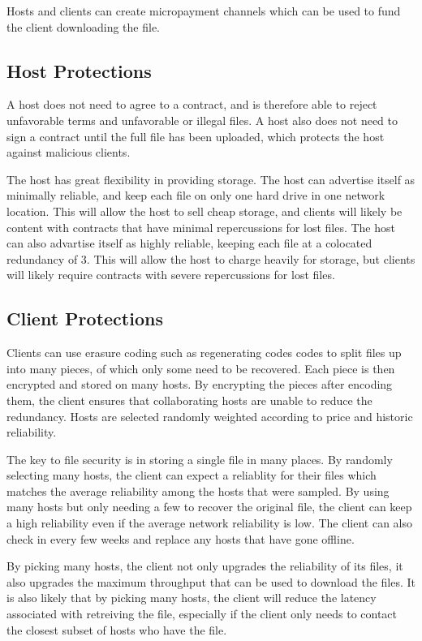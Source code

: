 \documentclass[twocolumn]{article}
\begin{document}
Hosts and clients can create micropayment channels \cite{mpc} which can be used to fund the client downloading the file.

\subsection{Host Protections}
A host does not need to agree to a contract, and is therefore able to reject unfavorable terms and unfavorable or illegal files.
A host also does not need to sign a contract until the full file has been uploaded, which protects the host against malicious clients.

The host has great flexibility in providing storage.
The host can advertise itself as minimally reliable, and keep each file on only one hard drive in one network location.
This will allow the host to sell cheap storage, and clients will likely be content with contracts that have minimal repercussions for lost files.
The host can also advartise itself as highly reliable, keeping each file at a colocated redundancy of 3.
This will allow the host to charge heavily for storage, but clients will likely require contracts with severe repercussions for lost files.

\subsection{Client Protections}
Clients can use erasure coding such as regenerating codes \cite{reg} codes to split files up into many pieces, of which only some need to be recovered.
Each piece is then encrypted and stored on many hosts.
By encrypting the pieces after encoding them, the client ensures that collaborating hosts are unable to reduce the redundancy.
Hosts are selected randomly weighted according to price and historic reliability.

The key to file security is in storing a single file in many places.
By randomly selecting many hosts, the client can expect a reliablity for their files which matches the average reliability among the hosts that were sampled.
By using many hosts but only needing a few to recover the original file, the client can keep a high reliability even if the average network reliability is low.
The client can also check in every few weeks and replace any hosts that have gone offline.

By picking many hosts, the client not only upgrades the reliability of its files, it also upgrades the maximum throughput that can be used to download the files.
It is also likely that by picking many hosts, the client will reduce the latency associated with retreiving the file, especially if the client only needs to contact the closest subset of hosts who have the file.
\end{document}

